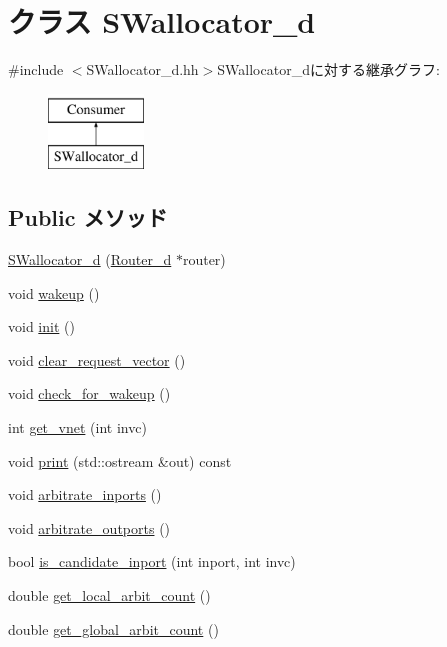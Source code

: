 \hypertarget{classSWallocator__d}{
\section{クラス SWallocator\_\-d}
\label{classSWallocator__d}
}


{\ttfamily \#include $<$SWallocator\_\-d.hh$>$}SWallocator\_\-dに対する継承グラフ:\begin{figure}[H]
\begin{center}
\leavevmode
\includegraphics[height=2cm]{classSWallocator__d}
\end{center}
\end{figure}
\subsection*{Public メソッド}
\begin{DoxyCompactItemize}
\item 
\hyperlink{classSWallocator__d_a596f26738ddedb9680507152eaeb3f5c}{SWallocator\_\-d} (\hyperlink{classRouter__d}{Router\_\-d} $\ast$router)
\item 
void \hyperlink{classSWallocator__d_ae674290a26ecbd622c5160e38e8a4fe9}{wakeup} ()
\item 
void \hyperlink{classSWallocator__d_a02fd73d861ef2e4aabb38c0c9ff82947}{init} ()
\item 
void \hyperlink{classSWallocator__d_ac8b7aea8034854f208223b1c36fe1b68}{clear\_\-request\_\-vector} ()
\item 
void \hyperlink{classSWallocator__d_a3312235aad1a35d2eb8dfe6b3a93d880}{check\_\-for\_\-wakeup} ()
\item 
int \hyperlink{classSWallocator__d_afdff1bb4dda9168cb4bf8b78aa0cf9d8}{get\_\-vnet} (int invc)
\item 
void \hyperlink{classSWallocator__d_ac55fe386a101fbae38c716067c9966a0}{print} (std::ostream \&out) const 
\item 
void \hyperlink{classSWallocator__d_ad8b8a8461af75f7a4d5bd0157ad99e20}{arbitrate\_\-inports} ()
\item 
void \hyperlink{classSWallocator__d_a275d37eb2473a7b01f806f9822a09657}{arbitrate\_\-outports} ()
\item 
bool \hyperlink{classSWallocator__d_ae08b6831390b7d551e176fe35de2bd38}{is\_\-candidate\_\-inport} (int inport, int invc)
\item 
double \hyperlink{classSWallocator__d_a23b4a72d39fe6a47f8e896c3ba267426}{get\_\-local\_\-arbit\_\-count} ()
\item 
double \hyperlink{classSWallocator__d_aac435b881c9b265abadc8989c48dab3f}{get\_\-global\_\-arbit\_\-count} ()
\end{DoxyCompactItemize}
